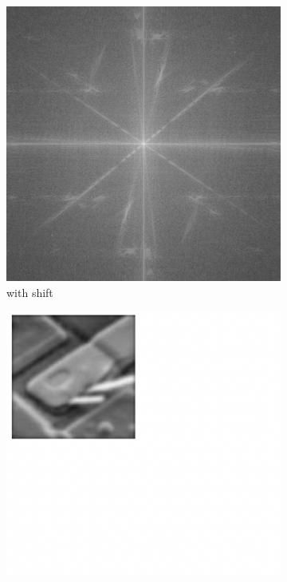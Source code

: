 \documentclass[
	12pt, %
]{style/fphw}
\begin{document}
\begin{figure}[H]
\begin{subfigure}[b]{0.2\textwidth}
         \includegraphics[width=\textwidth]{plots2/Q5_1_spectrum.png}
         \caption{with shift}
         \label{Q5_2_lowpass_30_error.tif}
     \end{subfigure}
     \hfill
     \begin{subfigure}[b]{0.2\textwidth}
         \centering
         \includegraphics[width=\textwidth]{chart/padding.png}

\end{subfigure}
\end{figure}
\end{document}
